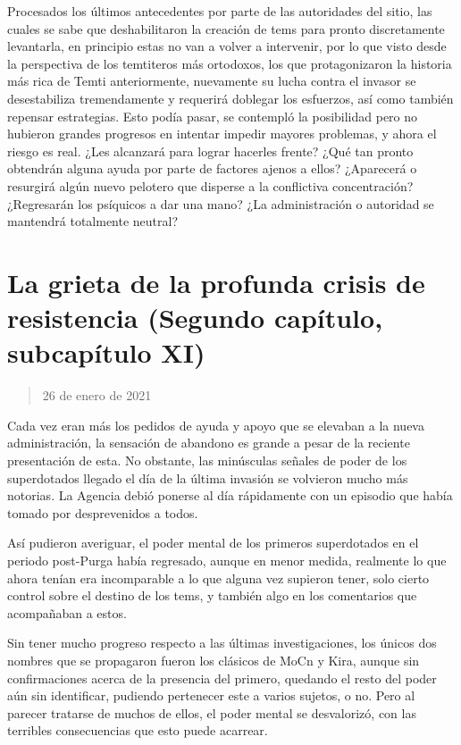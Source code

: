 \documentclass[
  spanish,
]{book}
\begin{document}
Procesados los últimos antecedentes por parte de las autoridades del sitio, las cuales se sabe que deshabilitaron la creación de tems para pronto discretamente levantarla, en principio estas no van a volver a intervenir, por lo que visto desde la perspectiva de los temtiteros más ortodoxos, los que protagonizaron la historia más rica de Temti anteriormente, nuevamente su lucha contra el invasor se desestabiliza tremendamente y requerirá doblegar los esfuerzos, así como también repensar estrategias. Esto podía pasar, se contempló la posibilidad pero no hubieron grandes progresos en intentar impedir mayores problemas, y ahora el riesgo es real. ¿Les alcanzará para lograr hacerles frente? ¿Qué tan pronto obtendrán alguna ayuda por parte de factores ajenos a ellos? ¿Aparecerá o resurgirá algún nuevo pelotero que disperse a la conflictiva concentración? ¿Regresarán los psíquicos a dar una mano? ¿La administración o autoridad se mantendrá totalmente neutral?

\hypertarget{la-grieta-de-la-profunda-crisis-de-resistencia-segundo-capuxedtulo-subcapuxedtulo-xi}{%
\section{La grieta de la profunda crisis de resistencia (Segundo capítulo, subcapítulo XI)}\label{la-grieta-de-la-profunda-crisis-de-resistencia-segundo-capuxedtulo-subcapuxedtulo-xi}}

\begin{quote}
26 de enero de 2021
\end{quote}

Cada vez eran más los pedidos de ayuda y apoyo que se elevaban a la nueva administración, la sensación de abandono es grande a pesar de la reciente presentación de esta. No obstante, las minúsculas señales de poder de los superdotados llegado el día de la última invasión se volvieron mucho más notorias. La Agencia debió ponerse al día rápidamente con un episodio que había tomado por desprevenidos a todos.

Así pudieron averiguar, el poder mental de los primeros superdotados en el periodo post-Purga había regresado, aunque en menor medida, realmente lo que ahora tenían era incomparable a lo que alguna vez supieron tener, solo cierto control sobre el destino de los tems, y también algo en los comentarios que acompañaban a estos.

Sin tener mucho progreso respecto a las últimas investigaciones, los únicos dos nombres que se propagaron fueron los clásicos de MoCn y Kira, aunque sin confirmaciones acerca de la presencia del primero, quedando el resto del poder aún sin identificar, pudiendo pertenecer este a varios sujetos, o no. Pero al parecer tratarse de muchos de ellos, el poder mental se desvalorizó, con las terribles consecuencias que esto puede acarrear.
\end{document}
